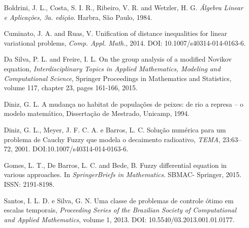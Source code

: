 \documentclass[a4,11pt]{pssbmac}
\begin{document}
\begin{thebibliography}{00}

Boldrini, J. L., Costa, S. I. R., Ribeiro, V. R. and Wetzler, H. G. {\it Álgebra Linear e Aplicações, 3a. edição}. Harbra, São Paulo, 1984.

Cuminato, J. A. and Ruas, V. Unification of distance inequalities for linear variational problems, 
{\it Comp. Appl. Math.}, 2014. DOI: 10.1007/s40314-014-0163-6.
 
Da Silva, P. L. and Freire, I. L. On the group analysis of a modified Novikov equation, 
{\it Interdisciplinary Topics in Applied Mathematics, Modeling and Computational Science}, 
Springer Proceedings in Mathematics and Statistics,  volume 117, chapter 23, pages 161-166, 2015.

Diniz, G. L. A mudança no habitat de populações de peixes: de rio a represa -- o modelo 
matemático, Dissertação de Mestrado, Unicamp, 1994.

Diniz, G. L., Meyer, J. F. C. A. e Barros, L. C. Solução numérica para um problema de 
Cauchy Fuzzy que modela o decaimento radioativo, {\it TEMA},  23:63--72, 2001. DOI:10.1007/s40314-014-0163-6.

Gomes, L. T., De Barros, L. C. and Bede, B. Fuzzy differential equation in various approaches. 
In {\it SpringerBriefs in Mathematics}. SBMAC- Springer, 2015. ISSN: 2191-8198.



 Santos, I. L. D. e Silva, G. N. Uma classe de problemas de controle ótimo 
em escalas temporais, {\it Proceeding Series of the Brazilian Society of Computational and 
Applied Mathematics}, volume 1, 2013. DOI: 10.5540/03.2013.001.01.0177.

\end{thebibliography}
\end{document}
